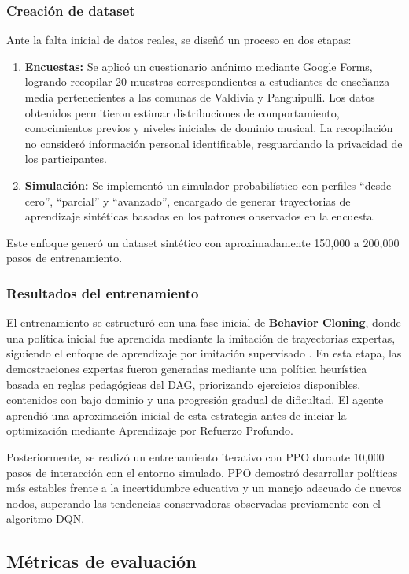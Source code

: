 \subsubsection{Creación de dataset}
Ante la falta inicial de datos reales, se diseñó un proceso en dos etapas:
\begin{enumerate}
    \item \textbf{Encuestas:} Se aplicó un cuestionario anónimo mediante Google Forms, logrando recopilar 20 muestras correspondientes a estudiantes de enseñanza media pertenecientes a las comunas de Valdivia y Panguipulli. Los datos obtenidos permitieron estimar distribuciones de comportamiento, conocimientos previos y niveles iniciales de dominio musical. La recopilación no consideró información personal identificable, resguardando la privacidad de los participantes.
    \item \textbf{Simulación:} Se implementó un simulador probabilístico con perfiles ``desde cero'', ``parcial'' y ``avanzado'', encargado de generar trayectorias de aprendizaje sintéticas basadas en los patrones observados en la encuesta.
\end{enumerate}
Este enfoque generó un dataset sintético con aproximadamente 150,000 a 200,000 pasos de entrenamiento.

\subsubsection{Resultados del entrenamiento}
El entrenamiento se estructuró con una fase inicial de \textbf{Behavior Cloning}, donde una política inicial fue aprendida mediante la imitación de trayectorias expertas, siguiendo el enfoque de aprendizaje por imitación supervisado \cite{osa2018imitation}. En esta etapa, las demostraciones expertas fueron generadas mediante una política heurística basada en reglas pedagógicas del DAG, priorizando ejercicios disponibles, contenidos con bajo dominio y una progresión gradual de dificultad. El agente aprendió una aproximación inicial de esta estrategia antes de iniciar la optimización mediante Aprendizaje por Refuerzo Profundo.

Posteriormente, se realizó un entrenamiento iterativo con PPO durante 10,000 pasos de interacción con el entorno simulado. PPO demostró desarrollar políticas más estables frente a la incertidumbre educativa y un manejo adecuado de nuevos nodos, superando las tendencias conservadoras observadas previamente con el algoritmo DQN.


\subsection{Métricas de evaluación}

